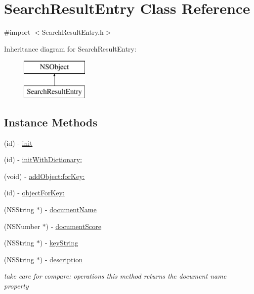\hypertarget{interface_search_result_entry}{\section{Search\-Result\-Entry Class Reference}
\label{interface_search_result_entry}
}


{\ttfamily \#import $<$Search\-Result\-Entry.\-h$>$}

Inheritance diagram for Search\-Result\-Entry\-:\begin{figure}[H]
\begin{center}
\leavevmode
\includegraphics[height=2.000000cm]{interface_search_result_entry}
\end{center}
\end{figure}
\subsection*{Instance Methods}
\begin{DoxyCompactItemize}
\item 
(id) -\/ \hyperlink{interface_search_result_entry_a4213bb26f5207ee3f402fe463badc691}{init}
\item 
(id) -\/ \hyperlink{interface_search_result_entry_afdb9de914d97184d0f9f4acd5ce4b018}{init\-With\-Dictionary\-:}
\item 
(void) -\/ \hyperlink{interface_search_result_entry_a8b0874363f649cdaf14c568eceee1c80}{add\-Object\-:for\-Key\-:}
\item 
(id) -\/ \hyperlink{interface_search_result_entry_a8ecdbc0eaa1b5fe4468f0300cb8c3b2b}{object\-For\-Key\-:}
\item 
(N\-S\-String $\ast$) -\/ \hyperlink{interface_search_result_entry_a45308588bd1d2dc05240a9e1852d0da2}{document\-Name}
\item 
(N\-S\-Number $\ast$) -\/ \hyperlink{interface_search_result_entry_a24195ea4f27dc591671f326321ed42a4}{document\-Score}
\item 
(N\-S\-String $\ast$) -\/ \hyperlink{interface_search_result_entry_aab0f64e5fd258b6193914b0d1a9c591b}{key\-String}
\item 
(N\-S\-String $\ast$) -\/ \hyperlink{interface_search_result_entry_a0920dc7935061bc57daab91706be5934}{description}
\begin{DoxyCompactList}\small\item\em take care for compare\-: operations this method returns the document name property \end{DoxyCompactList}\end{DoxyCompactItemize}
